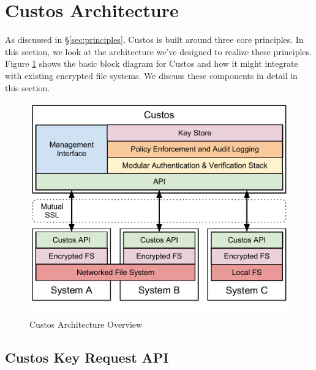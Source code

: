 \section{Custos Architecture}
\label{sec:arch}

As discussed in \S \ref{sec:principles}, Custos is built around three
core principles. In this section, we look at the architecture we've
designed to realize these principles. Figure \ref{fig:custosoverview}
shows the basic block diagram for Custos and how it might integrate
with existing encrypted file systems. We discuss these components in
detail in this section.

\begin{figure}[!tb]
  \centering
  \includegraphics[width=\columnwidth]{./include/CustosOverview.pdf}
  \caption{Custos Architecture Overview}
  \label{fig:custosoverview}
\end{figure}

\subsection{Custos Key Request API}

